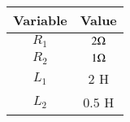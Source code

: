 \begin{tabular}{|c|c|} 
      \hline
\textbf{Variable}& \textbf{Value}\\\hline
         $R_1$ & $2\ohm$\\\hline
          $R_2$ &$1\ohm$\\\hline
          $L_1$  &$2$ H \\ \hline
         $L_2$  &$0.5$ H \\ \hline
    \end{tabular}

